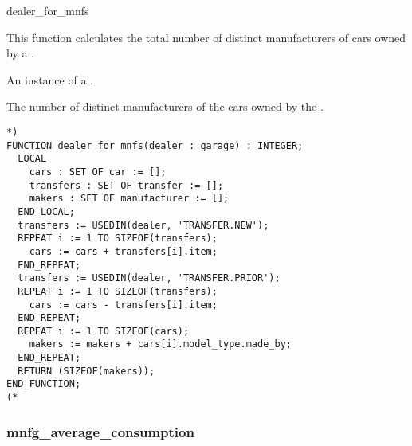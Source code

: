 \documentclass{article}
\begin{document}
\begin{Mnamedesc}{dealer_for_mnfs}
\begin{Mdesctext}
    This function calculates the total number of distinct manufacturers of cars
owned by a .
\end{Mdesctext}

\begin{Ipars}

\item[dealer:] An instance of a .

\item[RESULT:] The number of distinct manufacturers of the cars owned by the
.
\end{Ipars}

\begin{Mexp}
\begin{verbatim}
*)
FUNCTION dealer_for_mnfs(dealer : garage) : INTEGER;
  LOCAL
    cars : SET OF car := [];
    transfers : SET OF transfer := [];
    makers : SET OF manufacturer := [];
  END_LOCAL;
  transfers := USEDIN(dealer, 'TRANSFER.NEW');
  REPEAT i := 1 TO SIZEOF(transfers);
    cars := cars + transfers[i].item;
  END_REPEAT;
  transfers := USEDIN(dealer, 'TRANSFER.PRIOR');
  REPEAT i := 1 TO SIZEOF(transfers);
    cars := cars - transfers[i].item;
  END_REPEAT;
  REPEAT i := 1 TO SIZEOF(cars);
    makers := makers + cars[i].model_type.made_by;
  END_REPEAT;
  RETURN (SIZEOF(makers));
END_FUNCTION;
(*
\end{verbatim}
\end{Mexp}
\end{Mnamedesc}

\subsubsection{mnfg\_average\_consumption}
\end{document}
